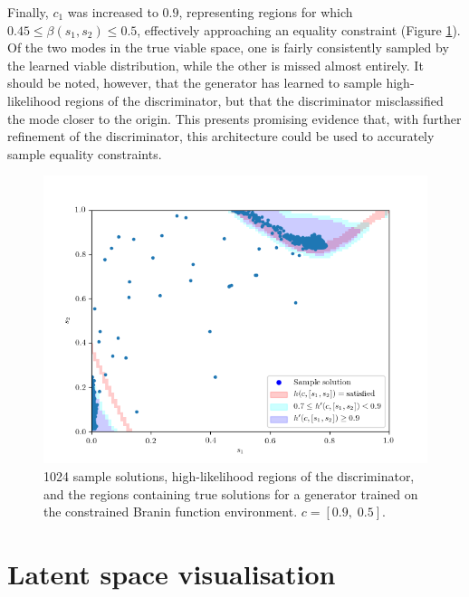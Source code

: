 \documentclass[../../main.tex]{subfiles}
\begin{document}
Finally, $c_1$ was increased to $0.9$, representing regions for which $0.45\le\beta(s_1,s_2)\le0.5$, effectively approaching an equality constraint (Figure \ref{fig:equality09}).
Of the two modes in the true viable space, one is fairly consistently sampled by the learned viable distribution, while the other is missed almost entirely.
It should be noted, however, that the generator has learned to sample high-likelihood regions of the discriminator, but that the discriminator misclassified the mode closer to the origin.
This presents promising evidence that, with further refinement of the discriminator, this architecture could be used to accurately sample equality constraints.
\begin{figure}[H]
    \begin{center}
    \includegraphics[width=\textwidth]{equality09}
    \caption{
        1024 sample solutions, high-likelihood regions of the discriminator, and the regions containing true solutions for a generator trained on the constrained Branin function environment.
        $c=[0.9,\;0.5]$.
    }
    \label{fig:equality09}
    \end{center}
\end{figure}

\section{Latent space visualisation}
\end{document}
